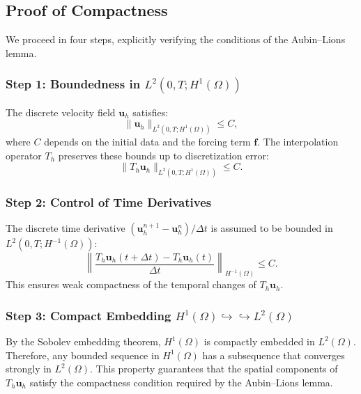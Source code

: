 \subsection{Proof of Compactness}

We proceed in four steps, explicitly verifying the conditions of the Aubin--Lions lemma.

\subsubsection{Step 1: Boundedness in $L^2(0,T; H^1(\Omega))$}

The discrete velocity field $\mathbf{u}_h$ satisfies:
\begin{equation}
\|\mathbf{u}_h\|_{L^2(0,T; H^1(\Omega))} \leq C,
\end{equation}
where $C$ depends on the initial data and the forcing term $\mathbf{f}$. The interpolation operator $T_h$ preserves these bounds up to discretization error:
\begin{equation}
\|T_h \mathbf{u}_h\|_{L^2(0,T; H^1(\Omega))} \leq C.
\end{equation}

\subsubsection{Step 2: Control of Time Derivatives}

The discrete time derivative \((\mathbf{u}_h^{n+1} - \mathbf{u}_h^n)/\Delta t\) is assumed to be bounded in $L^2(0,T; H^{-1}(\Omega))$:
\begin{equation}
\left\|\frac{T_h \mathbf{u}_h(t+\Delta t) - T_h \mathbf{u}_h(t)}{\Delta t}\right\|_{H^{-1}(\Omega)} \leq C.
\end{equation}
This ensures weak compactness of the temporal changes of $T_h \mathbf{u}_h$.

\subsubsection{Step 3: Compact Embedding $H^1(\Omega) \hookrightarrow\hookrightarrow L^2(\Omega)$}

By the Sobolev embedding theorem, $H^1(\Omega)$ is compactly embedded in $L^2(\Omega)$. Therefore, any bounded sequence in $H^1(\Omega)$ has a subsequence that converges strongly in $L^2(\Omega)$. This property guarantees that the spatial components of $T_h \mathbf{u}_h$ satisfy the compactness condition required by the Aubin--Lions lemma.

